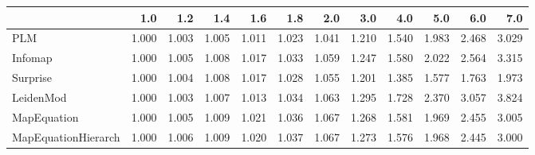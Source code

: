 \begin{tabular}{lrrrrrrrrrrr}
\toprule
{} &   1.0 &   1.2 &   1.4 &   1.6 &   1.8 &   2.0 &   3.0 &   4.0 &   5.0 &   6.0 &   7.0 \\
\midrule
PLM                 & 1.000 & 1.003 & 1.005 & 1.011 & 1.023 & 1.041 & 1.210 & 1.540 & 1.983 & 2.468 & 3.029 \\
Infomap             & 1.000 & 1.005 & 1.008 & 1.017 & 1.033 & 1.059 & 1.247 & 1.580 & 2.022 & 2.564 & 3.315 \\
Surprise            & 1.000 & 1.004 & 1.008 & 1.017 & 1.028 & 1.055 & 1.201 & 1.385 & 1.577 & 1.763 & 1.973 \\
LeidenMod           & 1.000 & 1.003 & 1.007 & 1.013 & 1.034 & 1.063 & 1.295 & 1.728 & 2.370 & 3.057 & 3.824 \\
MapEquation         & 1.000 & 1.005 & 1.009 & 1.021 & 1.036 & 1.067 & 1.268 & 1.581 & 1.969 & 2.455 & 3.005 \\
MapEquationHierarch & 1.000 & 1.006 & 1.009 & 1.020 & 1.037 & 1.067 & 1.273 & 1.576 & 1.968 & 2.445 & 3.000 \\
\bottomrule
\end{tabular}
